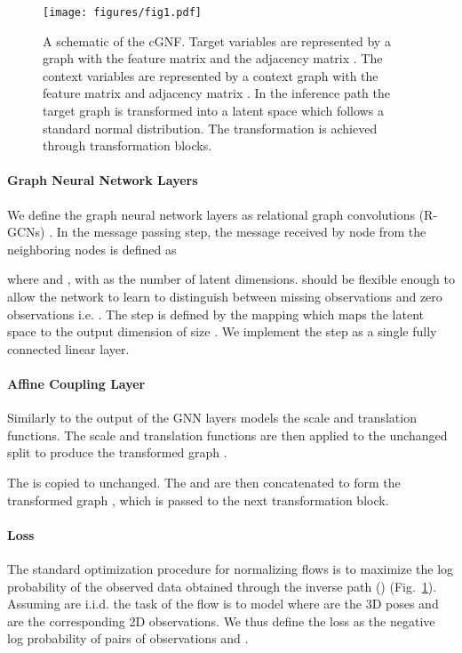 \documentclass{article} \usepackage{iclr2023_conference,times}
\begin{document}
    \begin{figure}[t!]
\centering
\texttt{[image: figures/fig1.pdf]}
\caption{
 A schematic of the cGNF. Target variables  are represented by a graph with the feature matrix  and the adjacency matrix . The context variables are represented by a context graph  with the feature matrix  and adjacency matrix . In the inference path the target graph  is transformed into a latent space  which follows a standard normal distribution. The transformation is achieved through  transformation blocks.
}

\label{fig:fig1}
\end{figure}

    \paragraph{Graph Neural Network Layers}
    We define the graph neural network layers as relational graph convolutions (R-GCNs) \citep{schlichtkrull2017modeling}.
    In the message passing step, the message received by node  from the neighboring nodes is defined as
    
    where  and , with  as the number of latent dimensions.
     should be flexible enough to allow the network to learn to distinguish between missing observations and zero observations i.e. .
    The  step is defined by the mapping  which maps the latent space to the output dimension of size .
    We implement the  step as a single fully connected linear layer.

    \paragraph{Affine Coupling Layer}
    Similarly to \citet{Liu_Kumar_Ba_Kiros_Swersky_2019} the output of the GNN layers models the scale  and translation  functions.
    The scale and translation functions are then applied to the unchanged split  to produce the transformed graph .
    
    The  is copied to  unchanged.
    The  and  are then concatenated to form the transformed graph , which is passed to the next transformation block.
    
    \paragraph{Loss}
    The standard optimization procedure for normalizing flows is to maximize the log probability of the observed data  obtained through the inverse path () (Fig.~\ref{fig:fig1}).
    Assuming  are i.i.d. the task of the flow is to model 
    where  are the 3D poses and  are the corresponding 2D observations.
    We thus define the loss as the negative log probability of pairs of observations  and .
    
\end{document}
